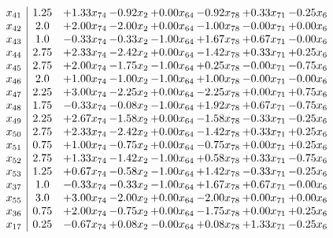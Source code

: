 \documentclass[8pt]{article}
\begin{document}
\[\begin{array}{c| c c@{\hskip 2pt} c@{\hskip 2pt} c@{\hskip 2pt} c@{\hskip 2pt} c@{\hskip 2pt} c@{\hskip 2pt} }
 x_{41}   &  1.25 & +  1.33 x_{74} & -0.92 x_{2} & +  0.00 x_{64} & -0.92 x_{78} & +  0.33 x_{71} & -0.25 x_{6}\\
 x_{42}   &  2.0 & +  2.00 x_{74} & -2.00 x_{2} & +  0.00 x_{64} & -1.00 x_{78} & -0.00 x_{71} & +  0.00 x_{6}\\
 x_{43}   &  1.0 & -0.33 x_{74} & -0.33 x_{2} & -1.00 x_{64} & +  1.67 x_{78} & +  0.67 x_{71} & -0.00 x_{6}\\
 x_{44}   &  2.75 & +  2.33 x_{74} & -2.42 x_{2} & +  0.00 x_{64} & -1.42 x_{78} & +  0.33 x_{71} & +  0.25 x_{6}\\
 x_{45}   &  2.75 & +  2.00 x_{74} & -1.75 x_{2} & -1.00 x_{64} & +  0.25 x_{78} & -0.00 x_{71} & -0.75 x_{6}\\
 x_{46}   &  2.0 & +  1.00 x_{74} & -1.00 x_{2} & -1.00 x_{64} & +  1.00 x_{78} & -0.00 x_{71} & -0.00 x_{6}\\
 x_{47}   &  2.25 & +  3.00 x_{74} & -2.25 x_{2} & +  0.00 x_{64} & -2.25 x_{78} & +  0.00 x_{71} & +  0.75 x_{6}\\
 x_{48}   &  1.75 & -0.33 x_{74} & -0.08 x_{2} & -1.00 x_{64} & +  1.92 x_{78} & +  0.67 x_{71} & -0.75 x_{6}\\
 x_{49}   &  2.25 & +  2.67 x_{74} & -1.58 x_{2} & +  0.00 x_{64} & -1.58 x_{78} & -0.33 x_{71} & -0.25 x_{6}\\
 x_{50}   &  2.75 & +  2.33 x_{74} & -2.42 x_{2} & +  0.00 x_{64} & -1.42 x_{78} & +  0.33 x_{71} & +  0.25 x_{6}\\
 x_{51}   &  0.75 & +  1.00 x_{74} & -0.75 x_{2} & +  0.00 x_{64} & -0.75 x_{78} & +  0.00 x_{71} & +  0.25 x_{6}\\
 x_{52}   &  2.75 & +  1.33 x_{74} & -1.42 x_{2} & -1.00 x_{64} & +  0.58 x_{78} & +  0.33 x_{71} & -0.75 x_{6}\\
 x_{53}   &  1.25 & +  0.67 x_{74} & -0.58 x_{2} & -1.00 x_{64} & +  1.42 x_{78} & -0.33 x_{71} & -0.25 x_{6}\\
 x_{37}   &  1.0 & -0.33 x_{74} & -0.33 x_{2} & -1.00 x_{64} & +  1.67 x_{78} & +  0.67 x_{71} & -0.00 x_{6}\\
 x_{55}   &  3.0 & +  3.00 x_{74} & -2.00 x_{2} & +  0.00 x_{64} & -2.00 x_{78} & +  0.00 x_{71} & +  0.00 x_{6}\\
 x_{36}   &  0.75 & +  2.00 x_{74} & -0.75 x_{2} & +  0.00 x_{64} & -1.75 x_{78} & +  0.00 x_{71} & +  0.25 x_{6}\\
 x_{17}   &  0.25 & -0.67 x_{74} & +  0.08 x_{2} & -0.00 x_{64} & +  0.08 x_{78} & +  1.33 x_{71} & -0.25 x_{6}\\

\end{array}\]
\end{document}
